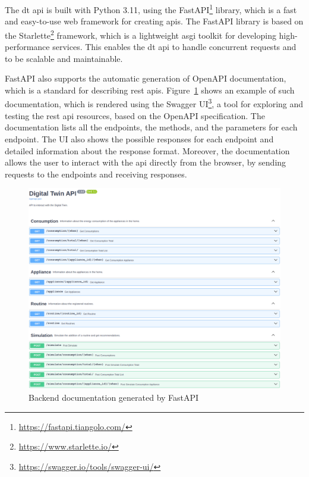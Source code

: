 The \acrshort{dt} \acrshort{api} is built with Python 3.11, using the FastAPI\footnote{\url{https://fastapi.tiangolo.com/}} library, which is a fast and easy-to-use web framework for creating \acrshort{api}s. The FastAPI library is based on the Starlette\footnote{\url{https://www.starlette.io/}} framework, which is a lightweight \acrfull{asgi} toolkit for developing high-performance services. This enables the \acrshort{dt} \acrshort{api} to handle concurrent requests and to be scalable and maintainable.

FastAPI also supports the automatic generation of OpenAPI documentation, which is a standard for describing \acrshort{rest} \acrshort{api}s. Figure~\ref{fig:backend_swagger} shows an example of such documentation, which is rendered using the Swagger UI\footnote{\url{https://swagger.io/tools/swagger-ui/}}, a tool for exploring and testing the \acrshort{rest} \acrshort{api} resources, based on the OpenAPI specification. The documentation lists all the endpoints, the methods, and the parameters for each endpoint. The UI also shows the possible responses for each endpoint and detailed information about the response format. Moreover, the documentation allows the user to interact with the \acrshort{api} directly from the browser, by sending requests to the endpoints and receiving responses.

\begin{figure}
    \centering
    \includegraphics[width=\textwidth]{images/backend_swagger.png}
    \caption{Backend documentation generated by FastAPI}
    \label{fig:backend_swagger}
\end{figure}

